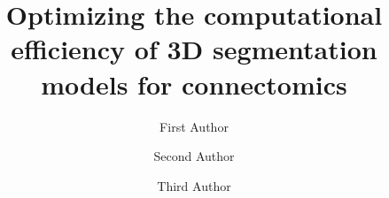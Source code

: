 \documentclass[runningheads]{llncs}
\begin{document}
%
\title{Optimizing the computational efficiency of 3D segmentation models for connectomics}

\author{
First Author 
\and
Second Author 
\and
Third Author
}



%
%
%
%
%
%
%
%
%
%
%
%
%
%
%
%
%
%
\end{document}

